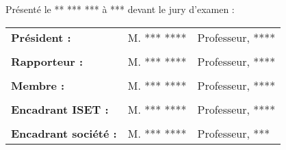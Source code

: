 \begin{titlepage}
\begin{center}
        Pr\'esent\'e le ** *** *** \`a *** devant le jury d'examen :\\
    \end{center}
    \begin{center}
        \begin{tabular}{lll}
            \textbf{Pr\'esident :}               & \textsc{M. *** ****} & Professeur, \textsc{****}
            \tabularnewline
            \tabularnewline
            \textbf{Rapporteur :}              & \textsc{M. *** ****} & Professeur, \textsc{****}
            \tabularnewline
            \tabularnewline
            \textbf{Membre :}                  & \textsc{M. *** ****} & Professeur, \textsc{****}
            \tabularnewline
            \tabularnewline
            \textbf{Encadrant \textsc{ISET} :} & \textsc{M. *** ****} & Professeur, \textsc{****}
            \tabularnewline
            \tabularnewline
            \textbf{Encadrant soci\'et\'e :}       & \textsc{M. *** ****} & Professeur, \textsc{***}
        \end{tabular}
    \end{center}
    \sloppy
\end{titlepage}
